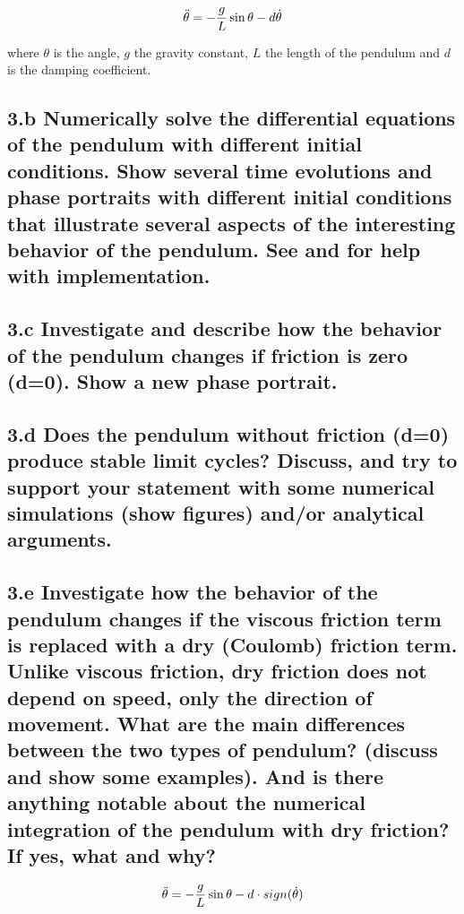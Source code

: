 \documentclass{cmc}
\begin{document}
\begin{equation}
  \label{eq:ode-pendulum}
  \ddot{\theta} = - {g \over L} \sin \theta - d \dot{\theta}
\end{equation}

where $\theta$ is the angle, $g$ the gravity constant, $L$ the length of the pendulum
and $d$ is the damping coefficient.


\subsection*{3.b Numerically solve the differential equations of the pendulum
  with different initial conditions.  Show several time evolutions and phase
  portraits with different initial conditions that illustrate several aspects of
  the interesting behavior of the pendulum. See  and
   for help with implementation.}


\subsection*{3.c Investigate and describe how the behavior of the pendulum
  changes if friction is zero (d=0).  Show a new phase portrait.}


\subsection*{3.d Does the pendulum without friction (d=0) produce stable limit
  cycles? Discuss, and try to support your statement with some numerical
  simulations (show figures) and/or analytical arguments.}


\subsection*{3.e Investigate how the behavior of the pendulum changes if the
  viscous friction term is replaced with a dry (Coulomb) friction term. Unlike
  viscous friction, dry friction does not depend on speed, only the direction of
  movement. What are the main differences between the two types of pendulum?
  (discuss and show some examples). And is there anything notable about the
  numerical integration of the pendulum with dry friction? If yes, what and why?}

\begin{equation}
  \label{eq:ode-pendulum-dry}
  \ddot{\theta} = - {g \over L} \sin \theta - d \cdot sign(\dot{\theta})
\end{equation}
\end{document}
